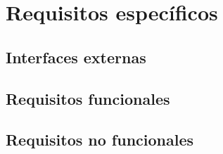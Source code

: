 \chapter{Requisitos espec\'ificos}

\section{Interfaces externas}

\section{Requisitos funcionales}
    

\section{Requisitos no funcionales}
